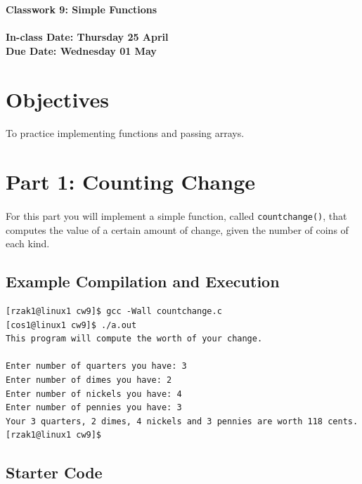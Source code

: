 \documentclass[letter,11pt]{article}
\begin{document}
\huge
\textbf{Classwork 9: Simple Functions}
\normalsize
\\ ~~ \\
\textbf{In-class Date: Thursday 25 April} \\
\textbf{Due Date: Wednesday 01 May}

\section*{Objectives}
\paragraph{}To practice implementing functions and passing arrays.

\section*{Part 1: Counting Change}
\paragraph{}For this part you will implement a simple function, called \texttt{countchange()}, that computes the value of a certain amount of change, given the number of coins of each kind.

\subsection*{Example Compilation and Execution}
\begin{verbatim}
[rzak1@linux1 cw9]$ gcc -Wall countchange.c
[cos1@linux1 cw9]$ ./a.out
This program will compute the worth of your change.

Enter number of quarters you have: 3
Enter number of dimes you have: 2
Enter number of nickels you have: 4
Enter number of pennies you have: 3
Your 3 quarters, 2 dimes, 4 nickels and 3 pennies are worth 118 cents.
[rzak1@linux1 cw9]$ 
\end{verbatim}

\subsection*{Starter Code}
\end{document}
